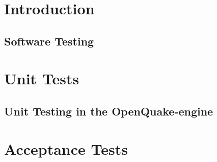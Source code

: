\documentclass[11pt,fleqn]{book} %
\begin{document}
\pagestyle{empty} %
\tableofcontents %
\cleardoublepage %
\pagestyle{fancy} %

% 


\part{Introduction}

\chapter{Software Testing}
   \label{chap:intro}
   

\thispagestyle{empty}
\part{Unit Tests}

\chapter{Unit Testing in the OpenQuake-engine}
   \label{chap:unit-tests}
   
   \cleardoublepage

\thispagestyle{empty}
\part{Acceptance Tests}
\end{document}
